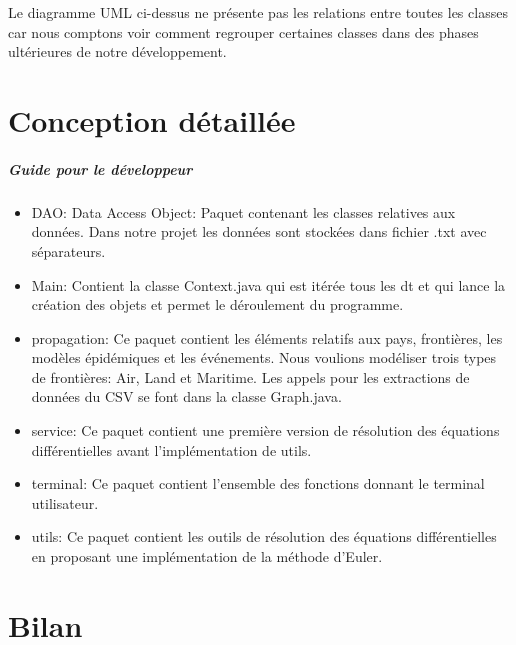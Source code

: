 \documentclass[12pt,a4paper]{report}
\begin{document}
\begin{flushleft}
	Le diagramme UML ci-dessus ne présente pas les relations entre toutes les classes car nous comptons voir comment regrouper certaines classes dans des phases ultérieures de notre développement.
\end{flushleft}


\chapter*{Conception détaillée}
\paragraph{Guide pour le développeur}

\begin{flushleft}
\begin{itemize}
L'aborescence des paquets est la suivante:
\item DAO: Data Access Object: Paquet contenant les classes relatives aux données. Dans notre projet les données sont stockées dans fichier .txt avec séparateurs.
\item Main: Contient la classe Context.java qui est itérée tous les dt et qui lance la création des objets et permet le déroulement du programme.
\item propagation: Ce paquet contient les éléments relatifs aux pays, frontières, les modèles épidémiques et les événements. Nous voulions modéliser trois types de frontières: Air, Land et Maritime. Les appels pour les extractions de données du CSV se font 
dans la classe Graph.java.
\item service: Ce paquet contient une première version de résolution des équations différentielles avant l'implémentation de utils.
\item terminal: Ce paquet contient l'ensemble des fonctions donnant le terminal utilisateur.
\item utils: Ce paquet contient les outils de résolution des équations différentielles en proposant une implémentation de la méthode d'Euler.
\end{itemize}
\end{flushleft}

\chapter*{Bilan}
\end{document}
